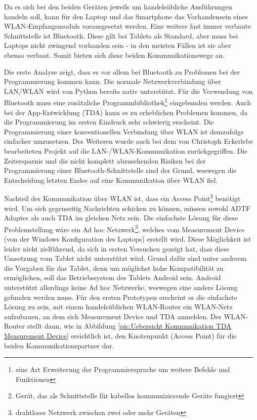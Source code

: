 \documentclass[12pt,a4paper]{report}
\begin{document}
Da es sich bei den beiden Geräten jeweils um handelsübliche Ausführungen handeln soll, kann für den Laptop und das Smartphone das Vorhandensein eines WLAN-Empfangsmoduls vorausgesetzt werden. Eine weitere fast immer verbaute Schnittstelle ist Bluetooth. Diese gilt bei Tablets als Standard, aber muss bei Laptops nicht zwingend vorhanden sein - in den meisten Fällen ist sie aber ebenso verbaut. Somit bieten sich diese beiden Kommunikationswege an.

Die erste Analyse zeigt, dass es vor allem bei Bluetooth zu Problemen bei der Programmierung kommen kann. Die normale Netzwerkverbindung über LAN/WLAN wird von Python bereits nativ unterstützt. Für die Verwendung von Bluetooth muss eine zusätzliche Programmbibliothek\footnote{eine Art Erweiterung der Programmiersprache um weitere Befehle und Funktionen} eingebunden werden. Auch bei der App-Entwicklung (TDA) kann es zu erheblichen Problemen kommen, da die Programmierung im ersten Eindruck sehr schwierig erscheint. Die Programmierung einer konventionellen Verbindung über WLAN ist demzufolge einfacher umzusetzen. Des Weiteren wurde auch bei dem von Christoph Eckerlebe bearbeiteten Projekt auf die LAN-/WLAN-Kommunikation zurückgegriffen. Die Zeitersparnis und die nicht komplett abzusehenden Risiken bei der Programmierung einer Bluetooth-Schnittstelle sind der Grund, weswegen die Entscheidung letzten Endes auf eine Kommunikation über WLAN fiel.

Nachteil der Kommunikation über WLAN ist, dass ein Access Point\footnote{Gerät, das als Schnittstelle für kabellos kommunizierende Geräte fungiert} benötigt wird. Um sich gegenseitig Nachrichten schicken zu können, müssen sowohl ADTF Adapter als auch TDA im gleichen Netz sein. Die einfachste Lösung für diese Problemstellung wäre ein Ad hoc Netzwerk\footnote{drahtloses Netzwerk zwischen zwei oder mehr Geräten}, welches vom Measurement Device (von der Windows Konfiguration des Laptops) erstellt wird. Diese Möglichkeit ist leider nicht zielführend, da sich in ersten Versuchen gezeigt hat, dass diese Umsetzung vom Tablet nicht unterstützt wird. Grund dafür sind unter anderem die Vorgaben für das Tablet, denn um möglichst hohe Kompatibilität zu ermöglichen, soll das Betriebssystem des Tablets Android sein. Android unterstützt allerdings keine Ad hoc Netzwerke, weswegen eine andere Lösung gefunden werden muss. Für den ersten Prototypen erscheint es die einfachste Lösung zu sein, mit einem handelsüblichen WLAN-Router ein WLAN-Netz aufzubauen, an dem sich Measurement Device und TDA anmelden. Der WLAN-Router stellt dann, wie in Abbildung \ref{pic:Uebersicht Kommunikation TDA Measurement Device} ersichtlich ist, den Knotenpunkt (Access Point) für die beiden Kommunikationspartner dar.
\end{document}
